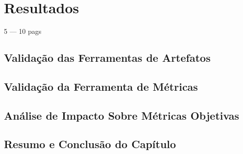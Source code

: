 
\chapter{Resultados}
5 --- 10 pags

\section{Validação das Ferramentas de Artefatos}

\section{Validação da Ferramenta de Métricas}

\section{Análise de Impacto Sobre Métricas Objetivas}

\section{Resumo e Conclusão do Capítulo}
